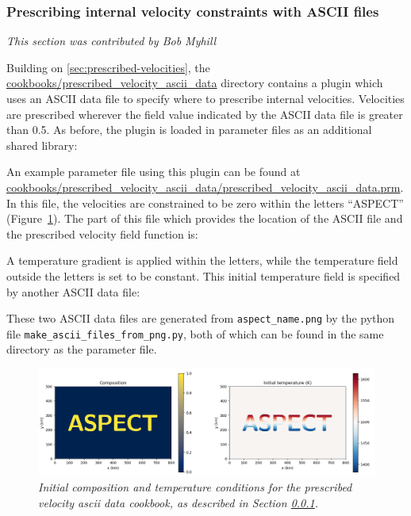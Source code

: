 \documentclass{article}
\begin{document}
\subsubsection{Prescribing internal velocity constraints with ASCII files}
\label{sec:prescribed-velocities-ascii-data}
\textit{This section was contributed by Bob Myhill}

Building on \ref{sec:prescribed-velocities}, the \url{cookbooks/prescribed_velocity_ascii_data}
directory contains a plugin which uses an ASCII data file to specify where to prescribe
internal velocities. Velocities are prescribed wherever the field value indicated by the ASCII data file
is greater than 0.5. As before, the plugin is loaded in parameter files as an additional shared library:


An example parameter file using this plugin can be found at
\url{cookbooks/prescribed_velocity_ascii_data/prescribed_velocity_ascii_data.prm}.
In this file, the velocities are constrained to be zero within the letters ``ASPECT'' (Figure~\ref{fig:prescribed-velocity-ascii-data-init}).
The part of this file which provides the location of the ASCII file and the
prescribed velocity field function is:

A temperature gradient is applied within the letters, while the temperature field outside the letters is set to be constant.
This initial temperature field is specified by another ASCII data file:

These two ASCII data files are generated from \texttt{aspect\_name.png} by the python file \texttt{make\_ascii\_files\_from\_png.py},
both of which can be found in the same directory as the parameter file.

\begin{figure}
    \centering
    \includegraphics[width=\textwidth]{cookbooks/prescribed_velocity_ascii_data/doc/prescribed_velocities_ascii_data_initial_conditions.png}
    \caption{\it Initial composition and temperature conditions for the prescribed velocity ascii data cookbook,
             as described in Section \ref{sec:prescribed-velocities-ascii-data}.}
    \label{fig:prescribed-velocity-ascii-data-init}
\end{figure}
\end{document}
